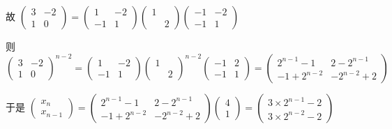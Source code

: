          故 \( \begin{pmatrix}
             3 & -2 \\
             1 & 0
         \end{pmatrix} = \begin{pmatrix}
             1  & -2 \\
             -1 & 1
         \end{pmatrix}\begin{pmatrix}
             1 &   \\
               & 2
         \end{pmatrix}\begin{pmatrix}
             -1 & -2 \\
             -1 & 1
         \end{pmatrix} \)

         则 \( \begin{pmatrix}
             3 & -2 \\
             1 & 0
         \end{pmatrix}^{n-2} = \begin{pmatrix}
             1  & -2 \\
             -1 & 1
         \end{pmatrix}\begin{pmatrix}
             1 &   \\
               & 2
         \end{pmatrix}^{n-2}\begin{pmatrix}
             -1 & 2 \\
             -1 & 1
         \end{pmatrix} = \begin{pmatrix}
             2^{n-1}-1  & 2-2^{n-1}  \\
             -1+2^{n-2} & -2^{n-2}+2
         \end{pmatrix} \)

         于是 \( \begin{pmatrix}
             x_{n} \\
             x_{n-1}
         \end{pmatrix} = \begin{pmatrix}
             2^{n-1}-1  & 2-2^{n-1}  \\
             -1+2^{n-2} & -2^{n-2}+2
         \end{pmatrix}\begin{pmatrix}
             4 \\
             1
         \end{pmatrix} = \begin{pmatrix}
             3\times2^{n-1}-2 \\
             3\times2^{n-2}-2
         \end{pmatrix} \)

